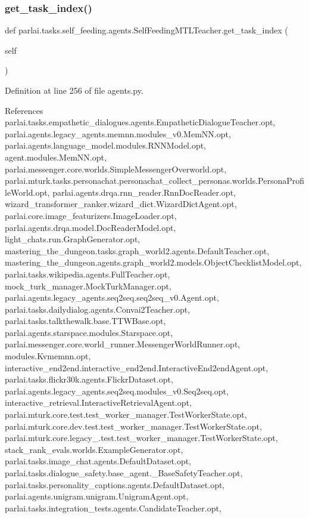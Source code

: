 \subsubsection{\texorpdfstring{get\+\_\+task\+\_\+index()}{get\_task\_index()}}
{\footnotesize\ttfamily def parlai.\+tasks.\+self\+\_\+feeding.\+agents.\+Self\+Feeding\+M\+T\+L\+Teacher.\+get\+\_\+task\+\_\+index (\begin{DoxyParamCaption}\item[{}]{self }\end{DoxyParamCaption})}



Definition at line 256 of file agents.\+py.



References parlai.\+tasks.\+empathetic\+\_\+dialogues.\+agents.\+Empathetic\+Dialogue\+Teacher.\+opt, parlai.\+agents.\+legacy\+\_\+agents.\+memnn.\+modules\+\_\+v0.\+Mem\+N\+N.\+opt, parlai.\+agents.\+language\+\_\+model.\+modules.\+R\+N\+N\+Model.\+opt, agent.\+modules.\+Mem\+N\+N.\+opt, parlai.\+messenger.\+core.\+worlds.\+Simple\+Messenger\+Overworld.\+opt, parlai.\+mturk.\+tasks.\+personachat.\+personachat\+\_\+collect\+\_\+personas.\+worlds.\+Persona\+Profile\+World.\+opt, parlai.\+agents.\+drqa.\+rnn\+\_\+reader.\+Rnn\+Doc\+Reader.\+opt, wizard\+\_\+transformer\+\_\+ranker.\+wizard\+\_\+dict.\+Wizard\+Dict\+Agent.\+opt, parlai.\+core.\+image\+\_\+featurizers.\+Image\+Loader.\+opt, parlai.\+agents.\+drqa.\+model.\+Doc\+Reader\+Model.\+opt, light\+\_\+chats.\+run.\+Graph\+Generator.\+opt, mastering\+\_\+the\+\_\+dungeon.\+tasks.\+graph\+\_\+world2.\+agents.\+Default\+Teacher.\+opt, mastering\+\_\+the\+\_\+dungeon.\+agents.\+graph\+\_\+world2.\+models.\+Object\+Checklist\+Model.\+opt, parlai.\+tasks.\+wikipedia.\+agents.\+Full\+Teacher.\+opt, mock\+\_\+turk\+\_\+manager.\+Mock\+Turk\+Manager.\+opt, parlai.\+agents.\+legacy\+\_\+agents.\+seq2seq.\+seq2seq\+\_\+v0.\+Agent.\+opt, parlai.\+tasks.\+dailydialog.\+agents.\+Convai2\+Teacher.\+opt, parlai.\+tasks.\+talkthewalk.\+base.\+T\+T\+W\+Base.\+opt, parlai.\+agents.\+starspace.\+modules.\+Starspace.\+opt, parlai.\+messenger.\+core.\+world\+\_\+runner.\+Messenger\+World\+Runner.\+opt, modules.\+Kvmemnn.\+opt, interactive\+\_\+end2end.\+interactive\+\_\+end2end.\+Interactive\+End2end\+Agent.\+opt, parlai.\+tasks.\+flickr30k.\+agents.\+Flickr\+Dataset.\+opt, parlai.\+agents.\+legacy\+\_\+agents.\+seq2seq.\+modules\+\_\+v0.\+Seq2seq.\+opt, interactive\+\_\+retrieval.\+Interactive\+Retrieval\+Agent.\+opt, parlai.\+mturk.\+core.\+test.\+test\+\_\+worker\+\_\+manager.\+Test\+Worker\+State.\+opt, parlai.\+mturk.\+core.\+dev.\+test.\+test\+\_\+worker\+\_\+manager.\+Test\+Worker\+State.\+opt, parlai.\+mturk.\+core.\+legacy\+\_.\+test.\+test\+\_\+worker\+\_\+manager.\+Test\+Worker\+State.\+opt, stack\+\_\+rank\+\_\+evals.\+worlds.\+Example\+Generator.\+opt, parlai.\+tasks.\+image\+\_\+chat.\+agents.\+Default\+Dataset.\+opt, parlai.\+tasks.\+dialogue\+\_\+safety.\+base\+\_\+agent.\+\_\+\+Base\+Safety\+Teacher.\+opt, parlai.\+tasks.\+personality\+\_\+captions.\+agents.\+Default\+Dataset.\+opt, parlai.\+agents.\+unigram.\+unigram.\+Unigram\+Agent.\+opt, parlai.\+tasks.\+integration\+\_\+tests.\+agents.\+Candidate\+Teacher.\+opt, 